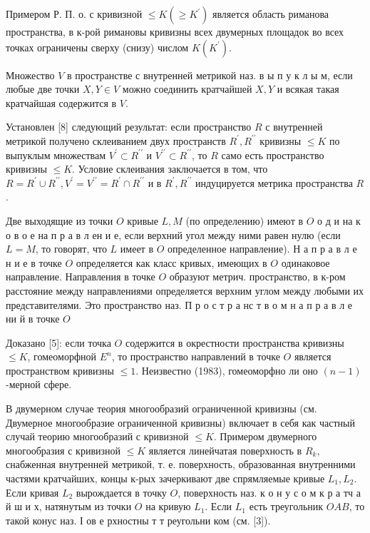 \documentclass[10pt]{article}
\begin{document}
Примером Р. П. о. с кривизной $\leqslant K\left(\geqslant K^{\prime}\right)$ является область риманова пространства, в к-рой римановы кривизны всех двумерных площадок во всех точках ограничены сверху (снизу) числом $K\left(K^{\prime}\right)$.



Множество $V$ в пространстве с внутренней метрикой наз. в ы п у к л ы м, если любые две точки $X, Y \in V$ можно соединить кратчайшей $X, Y$ и всякая такая кратчайшая содержится в $V$.



Установлен [8] следующий результат: если пространство $R$ с внутренней метрикой получено склеиванием двух пространств $R^{\prime}, R^{\prime \prime}$ кривизны $\leqslant K$ по выпуклым множествам $V^{\prime} \subset R^{\prime \prime}$ и $V^{\prime \prime} \subset R^{\prime \prime}$, то $R$ само есть пространство кривизны $\leqslant K$. Условие склеивания заключается в том, что $R=R^{\prime} \cup R^{\prime \prime}, V^{\prime}=V^{\prime \prime}=R^{\prime} \cap R^{\prime \prime}$ и в $R^{\prime}, R^{\prime \prime}$ индуцируется метрика пространства $R$.



Две выходящие из точки $O$ кривые $L, M$ (по определению) имеют в $O$ о д и на к о в о е на п р а в л ен и е, если верхний угол между ними равен нулю (если $L=M$, то говорят, что $L$ имеет в $O$ определенное направление). Н а п р а в л е н и е в точке $O$ определяется как класс кривых, имеющих в $O$ одинаковое направление. Направления в точке $O$ образуют метрич. пространство, в к-ром расстояние между направлениями определяется верхним углом между любыми их представителями. Это пространство наз. П р о с т р а нс т в о м н а п р а в л е ни й в точке $O$



Доказано [5]: если точка $O$ содержится в окрестности пространства кривизны $\leqslant K$, гомеоморфной $E^{n}$, то пространство направлений в точке $O$ является пространством кривизны $\leqslant 1$. Неизвестно (1983), гомеоморфно ли оно $(n-1)$-мерной сфере.



В двумерном случае теория многообразий ограниченной кривизны (см. Двумерное многообразие ограниченной кривизны) включает в себя как частный случай теорию многообразий с кривизной $\leqslant K$. Примером двумерного многообразия с кривизной $\leqslant K$ является линейчатая поверхность в $R_{k}$, снабженная внутренней метрикой, т. е. поверхность, образованная внутренними частями кратчайших, концы к-рых зачеркивают две спрямляемые кривые $L_{1}, L_{2}$. Если кривая $L_{2}$ вырождается в точку $O$, поверхность наз. к о н у с о м к р а тч а й ш и х, натянутым из точки $O$ на кривую $L_{1}$. Если $L_{1}$ есть треугольник $O A B$, то такой конус наз. І ов е рхностны т т реугольни ком (см. [3]).
\end{document}
